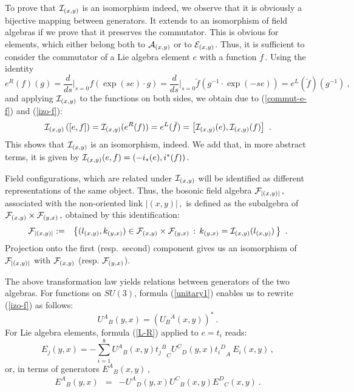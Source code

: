 \documentclass[a4paper,12pt]{article}
\begin{document}
To prove that ${\cal I}_{(x,y)}$ is an isomorphism indeed, we
observe that it is obviously a bijective mapping between
generators. It extends to an isomorphism of field algebras if we
prove that it preserves the commutator. This is obvious for
elements, which either belong both to ${\cal A}_{(x,y)}$ or to
${\cal E}_{(x,y)}$. Thus, it is sufficient to consider the
commutator of a Lie algebra element $e$ with a function $f\, .$
Using the identity
\begin{equation}
\label{odwracanie}
  e^R(f)(g) = \frac d{ds}{\Big |}_{s=0} f(\exp (se)\cdot g) =
    \frac d{ds}{\Big |}_{s=0} \breve{f}(g^{-1} \cdot \exp (-se)) =
    e^L(\breve{f})(g^{-1}) \ ,
\end{equation}
and applying ${\cal I}_{(x,y)}$ to the functions on both sides, we
obtain due to (\ref{commut-e-f}) and (\ref{izo-f}):
\begin{equation}
\label{izo-ef}
  {\cal I}_{(x,y)} \left( [ e , f ] \right) = {\cal
  I}_{(x,y)}(e^R (f)) = e^L(\breve{f}) = \left[
  {\cal I}_{(x,y)}(e) , {\cal I}_{(x,y)}(f) \right] \ .
\end{equation}
This shows that ${\cal I}_{(x,y)}$ is an isomorphism, indeed. We
add that, in more abstract terms, it is given by $ {\cal
I}_{(x,y)}(e,f) = (-i_*(e),i^*(f) ) \, .$

Field configurations, which are related under ${\cal I}_{(x,y)}$
will be identified as different representations of the same
object. Thus, the bosonic field algebra ${\cal F}_{|(x,y)|} \, ,$
associated with the non-oriented link $|(x,y)|\, ,$ is defined as
the subalgebra of ${\cal F}_{(x,y)} \times {\cal F}_{(y,x)} \, ,$
obtained by this identification:
\begin{eqnarray}
\label{gluons}
  {\cal F}_{|(x,y)|}&:=& \left\{ (l_{(x,y)} , k_{(y,x)} ) \in
{\cal F}_{(x,y)} \times {\cal F}_{(y,x)} \, : \,
  k_{(y,x)} = {\cal I}_{(x,y)} (l_{(x,y)}) \, \right\}
\ .
\end{eqnarray}
Projection onto the first (resp.~second) component gives us an
isomorphism of ${\cal F}_{|(x,y)|}$ with ${\cal F}_{(x,y)}$ (resp.
${\cal F}_{(y,x)}$).

The above transformation law yields relations between generators of
the two algebras. For functions on $SU(3)$, formula
(\ref{unitary1}) enables us to rewrite (\ref{izo-f}) as follows:
\begin{equation}
\label{izo-U}
  {U^A}_B(y,x) = ({U_B}^A(x,y))^* \ .
\end{equation}
For Lie algebra elements, formula (\ref{L-R}) applied to $e = t_i$
reads:
\begin{equation}
\label{er-el}
    {E}_j(y,x) = - \sum_{i=1}^8 {U^A}_B(x,y) {{t_j}^B}_C {U^C}_D(y,x)
{{t_i}^D}_A \  {E}_i(x,y) \, ,
\end{equation}
or, in terms of generators ${E^A}_B(x,y) \, ,$
\begin{eqnarray}\label{ER-EL-1}
   {E^A}_B(y,x) & = & - {U^A}_D(y,x) {U^C}_B(x,y) {E^D}_C(x,y)  \ .
\end{eqnarray}
\end{document}
